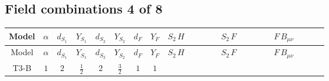 \documentclass[8pt]{article}
\begin{document}
\begin{landscape}
\subsection*{Field combinations 4 of 8}
\begin{longtable}{@{}cccccccc >{\raggedright\arraybackslash}p{0.21\linewidth} >{\raggedright\arraybackslash}p{0.21\linewidth} >{\raggedright\arraybackslash}p{0.21\linewidth}@{}}
\toprule
Model & $\alpha$ & $d_{S_1}$ & $Y_{S_1}$ & $d_{S_2}$ & $Y_{S_2}$ & $d_F$ & $Y_F$ & $S_2\,H$ & $S_2\,F$ & $F\,B_{\mu\nu}$ \\
\midrule
\endfirsthead
\toprule
Model & $\alpha$ & $d_{S_1}$ & $Y_{S_1}$ & $d_{S_2}$ & $Y_{S_2}$ & $d_F$ & $Y_F$ & $S_2\,H$ & $S_2\,F$ & $F\,B_{\mu\nu}$ \\
\midrule
\endhead
T3-B & $1$ & $2$ & $\frac{1}{2}$ & $2$ & $\frac{3}{2}$ & $1$ & $1$ & \scriptsize\adjustbox{max width=\linewidth}{$\begin{gathered} -\frac{2 \hbar  \overline{y_{2,i_1,r_1}} \overline{Y_{e,i_2,i_3}} H_{a_2} S_{2,j_2} y_{2,i_2,r_1} Y_{e,i_1,i_3} \mathcal{I}_{y_2,a_1,j_1} {\mathcal{C}_{LS_2F}}^{*}_{a_2,j_2} H_{a_1}{}^{\dagger } S_{2,j_1}{}^{\dagger }}{\epsilon } \\ -2 \hbar  \overline{y_{2,i_1,r_1}} \overline{Y_{e,i_2,i_3}} H_{a_2} S_{2,j_2} y_{2,i_2,r_1} Y_{e,i_1,i_3} \mathcal{I}_{y_2,a_1,j_1} {\mathcal{C}_{LS_2F}}^{*}_{a_2,j_2} H_{a_1}{}^{\dagger } S_{2,j_1}{}^{\dagger } \\ +H_{a_2} S_{2,j_2} H_{a_1}{}^{\dagger } S_{2,j_1}{}^{\dagger } \mathcal{I}_{H2,a_1,a_2,j_1,j_2}{}^1 \lambda_{HS_2}^{(1)}^{(1)}\end{gathered}$} & \scriptsize\adjustbox{max width=\linewidth}{$\begin{gathered} +C_{S_2^\dagger S_2} \hbar  \log \left(\frac{\bar{\mu}^{2}}{M_F^2}\right) \overline{y_{2,i_1,r_1}} S_{2,j_1} y_{2,i_1,r_1} S_{2,j_1}{}^{\dagger } \\ -\hbar  \log \left(\frac{\bar{\mu}^{2}}{M_F^2}\right) \overline{y_{2,i_1,r_1}} \overline{y_{2,i_2,r_2}} S_{2,j_1} S_{2,j_2} y_{2,i_1,r_2} y_{2,i_2,r_1} S_{2,j_1}{}^{\dagger } S_{2,j_2}{}^{\dagger } \\ -\hbar  \log \left(\frac{\bar{\mu}^{2}}{M_F^2}\right) \overline{y_{2,i_1,r_1}} S_{2,j_3} S_{2,j_4} y_{2,i_1,r_1} S_{2,j_1}{}^{\dagger } S_{2,j_2}{}^{\dagger } \mathcal{I}_{S_2,j_1,j_3,j_2,j_4}{}^1 \lambda_{S_2}^{(1)}^{(1)}\end{gathered}$} & \scriptsize\adjustbox{max width=\linewidth}{$\begin{gathered} -\hbar  \log \left(\frac{\bar{\mu}^{2}}{M_F^2}\right) B_{\mu _1\mu _2}^2\end{gathered}$} \\

\end{longtable}
\end{landscape}
\end{document}

